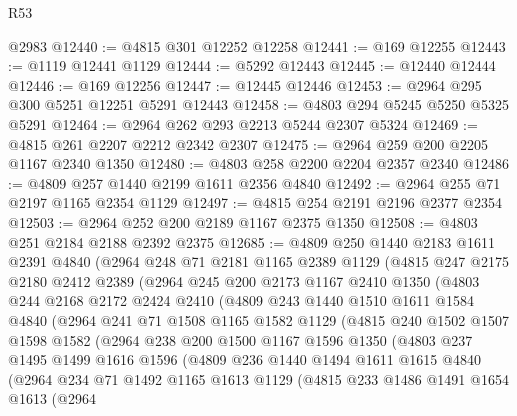 \begin{lexlean}{R53}
\begin{coremodule}
    @2983
@12440 := @4815 @301 @12252 @12258
@12441 := @169 @12255
@12443 := @1119 @12441 @1129
@12444 := @5292 @12443
@12445 := @12440 @12444
@12446 := @169 @12256
@12447 := @12445 @12446
@12453 := @2964 @295 @300 @5251 @12251 @5291 @12443
@12458 := @4803 @294 @5245 @5250 @5325 @5291
@12464 := @2964 @262 @293 @2213 @5244 @2307 @5324
@12469 := @4815 @261 @2207 @2212 @2342 @2307
@12475 := @2964 @259 @200 @2205 @1167 @2340 @1350
@12480 := @4803 @258 @2200 @2204 @2357 @2340
@12486 := @4809 @257 @1440 @2199 @1611 @2356 @4840
@12492 := @2964 @255 @71 @2197 @1165 @2354 @1129
@12497 := @4815 @254 @2191 @2196 @2377 @2354
@12503 := @2964 @252 @200 @2189 @1167 @2375 @1350
@12508 := @4803 @251 @2184 @2188 @2392 @2375
@12685 := @4809
    @250
    @1440
    @2183
    @1611
    @2391
    @4840
    (@2964
      @248
      @71
      @2181
      @1165
      @2389
      @1129
      (@4815
        @247
        @2175
        @2180
        @2412
        @2389
        (@2964
          @245
          @200
          @2173
          @1167
          @2410
          @1350
          (@4803
            @244
            @2168
            @2172
            @2424
            @2410
            (@4809
              @243
              @1440
              @1510
              @1611
              @1584
              @4840
              (@2964
                @241
                @71
                @1508
                @1165
                @1582
                @1129
                (@4815
                  @240
                  @1502
                  @1507
                  @1598
                  @1582
                  (@2964
                    @238
                    @200
                    @1500
                    @1167
                    @1596
                    @1350
                    (@4803
                      @237
                      @1495
                      @1499
                      @1616
                      @1596
                      (@4809
                        @236
                        @1440
                        @1494
                        @1611
                        @1615
                        @4840
                        (@2964
                          @234
                          @71
                          @1492
                          @1165
                          @1613
                          @1129
                          (@4815
                            @233
                            @1486
                            @1491
                            @1654
                            @1613
                            (@2964

\end{coremodule}
\end{lexlean}
